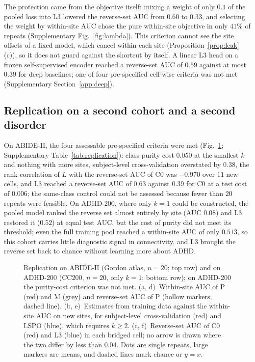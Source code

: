 The protection came from the objective itself: mixing a weight of only $0.1$ of the pooled loss into L3 lowered the reverse-set AUC from $0.60$ to $0.33$, and selecting the weight by within-site AUC chose the pure within-site objective in only $41\%$ of repeats (Supplementary Fig.~\ref{fig:lambda}). This criterion cannot see the site offsets of a fixed model, which cancel within each site (Proposition~\ref{prop:leak}(c)), so it does not guard against the shortcut by itself. A linear L3 head on a frozen self-supervised encoder reached a reverse-set AUC of $0.59$ against at most $0.39$ for deep baselines; one of four pre-specified cell-wise criteria was not met (Supplementary Section~\ref{app:deep}).


\subsection{Replication on a second cohort and a second disorder}\label{sec:res-replication}

On ABIDE-II, the four assessable pre-specified criteria were met (Fig.~\ref{fig:replication}; Supplementary Table~\ref{tab:replication}): class purity cost $0.050$ at the smallest $k$ and nothing with more sites, subject-level cross-validation overstated by $0.38$, the rank correlation of $L$ with the reverse-set AUC of C0 was $-0.970$ over $11$ new cells, and L3 reached a reverse-set AUC of $0.63$ against $0.39$ for C0 at a test cost of $0.006$; the same-class control could not be assessed because fewer than $20$ repeats were feasible. On ADHD-200, where only $k=1$ could be constructed, the pooled model ranked the reverse set almost entirely by site (AUC $0.08$) and L3 restored it ($0.52$) at equal test AUC, but the cost of purity did not meet its threshold; even the full training pool reached a within-site AUC of only $0.513$, so this cohort carries little diagnostic signal in connectivity, and L3 brought the reverse set back to chance without learning more about ADHD.

\begin{figure}[tbp]
\centering
{}
\caption{Replication on ABIDE-II (Gordon atlas, $n=20$; top row) and on ADHD-200 (CC200, $n=20$, only $k=1$; bottom row); on ADHD-200 the purity-cost criterion was not met. (a, d)~Within-site AUC of P (red) and M (grey) and reverse-set AUC of P (hollow markers, dashed line). (b, e)~Estimates from training data against the within-site AUC on new sites, for subject-level cross-validation (red) and LSPO (blue), which requires $k\ge2$. (c, f)~Reverse-set AUC of C0 (red) and L3 (blue) in each bridged cell; no arrow is drawn where the two differ by less than $0.04$. Dots are single repeats, large markers are means, and dashed lines mark chance or $y=x$.}
\label{fig:replication}
\end{figure}

